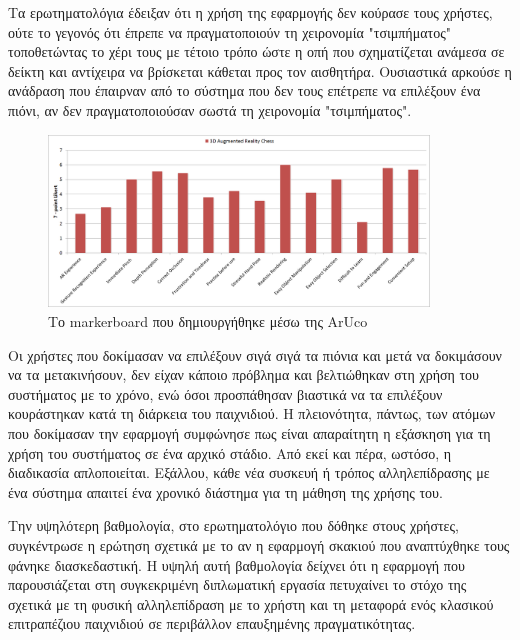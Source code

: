 Τα ερωτηματολόγια έδειξαν ότι η χρήση της εφαρμογής δεν κούρασε τους χρήστες, ούτε το γεγονός ότι έπρεπε να πραγματοποιούν τη χειρονομία "τσιμπήματος" τοποθετώντας το χέρι τους με τέτοιο τρόπο ώστε η οπή που σχηματίζεται ανάμεσα σε δείκτη και αντίχειρα να βρίσκεται κάθεται προς τον αισθητήρα. Ουσιαστικά αρκούσε η ανάδραση που έπαιρναν από το σύστημα που δεν τους επέτρεπε να επιλέξουν ένα πιόνι, αν δεν πραγματοποιούσαν σωστά τη χειρονομία "τσιμπήματος". 

\begin{figure}[H]
    \centering
    \includegraphics[width=0.9\textwidth]{Files/Figures/questionnaire.png}
    \caption[Το markerboard που δημιουργήθηκε μέσω της ArUco]{Το markerboard που δημιουργήθηκε μέσω της ArUco}
    \label{fig:markerboard}
\end{figure}




Οι χρήστες που δοκίμασαν να επιλέξουν σιγά σιγά τα πιόνια και μετά να δοκιμάσουν να τα μετακινήσουν, δεν είχαν κάποιο πρόβλημα και βελτιώθηκαν στη χρήση του συστήματος με το χρόνο, ενώ όσοι προσπάθησαν βιαστικά να τα επιλέξουν κουράστηκαν κατά τη διάρκεια του παιχνιδιού. Η πλειονότητα, πάντως, των ατόμων που δοκίμασαν την εφαρμογή συμφώνησε πως είναι απαραίτητη η εξάσκηση για τη χρήση του συστήματος σε ένα αρχικό στάδιο. Από εκεί και πέρα, ωστόσο, η διαδικασία απλοποιείται. Εξάλλου, κάθε νέα συσκευή ή τρόπος αλληλεπίδρασης με ένα σύστημα απαιτεί ένα χρονικό διάστημα για τη μάθηση της χρήσης του.


Την υψηλότερη βαθμολογία, στο ερωτηματολόγιο που δόθηκε στους χρήστες, συγκέντρωσε η ερώτηση σχετικά με το αν η εφαρμογή σκακιού που αναπτύχθηκε τους φάνηκε διασκεδαστική. Η υψηλή αυτή βαθμολογία δείχνει ότι η εφαρμογή που παρουσιάζεται στη συγκεκριμένη διπλωματική εργασία πετυχαίνει το στόχο της σχετικά με τη φυσική αλληλεπίδραση με το χρήστη και τη μεταφορά ενός κλασικού επιτραπέζιου παιχνιδιού σε περιβάλλον επαυξημένης πραγματικότητας.


